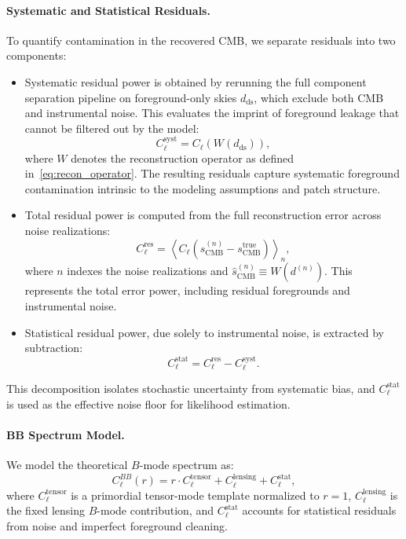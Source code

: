 \documentclass[fleqn,usenatbib]{mnras}
\begin{document}
\paragraph{Systematic and Statistical Residuals.}
To quantify contamination in the recovered CMB, we separate residuals into two components:
\begin{itemize}

    \item Systematic residual power is obtained by rerunning the full component separation pipeline on foreground-only skies \( d_{\mathrm{ds}} \), which exclude both CMB and instrumental noise. This evaluates the imprint of foreground leakage that cannot be filtered out by the model:
    \begin{equation}
    C_\ell^{\mathrm{syst}} = C_\ell \left( W(d_{\mathrm{ds}}) \right),
    \end{equation}
    where \( W \) denotes the reconstruction operator as defined in~\eqref{eq:recon_operator}. The resulting residuals capture systematic foreground contamination intrinsic to the modeling assumptions and patch structure.

    \item Total residual power is computed from the full reconstruction error across noise realizations:
    \begin{equation}
    C_\ell^{\mathrm{res}} = \left\langle C_\ell \left( \hat{s}_{\mathrm{CMB}}^{(n)} - s_{\mathrm{CMB}}^{\mathrm{true}} \right) \right\rangle_{n},
    \end{equation}
    where \( n \) indexes the noise realizations and \( \hat{s}_{\mathrm{CMB}}^{(n)} \equiv W(d^{(n)}) \).
    This represents the total error power, including residual foregrounds and instrumental noise.

    \item Statistical residual power, due solely to instrumental noise, is extracted by subtraction:
    \begin{equation}
    C_\ell^{\mathrm{stat}} = C_\ell^{\mathrm{res}} - C_\ell^{\mathrm{syst}}.
    \end{equation}
\end{itemize}
This decomposition isolates stochastic uncertainty from systematic bias, and \( C_\ell^{\mathrm{stat}} \) is used as the effective noise floor for likelihood estimation.

\paragraph{BB Spectrum Model.}
We model the theoretical \( B \)-mode spectrum as:
\begin{equation}
C_\ell^{BB}(r) = r \cdot C_\ell^{\mathrm{tensor}} + C_\ell^{\mathrm{lensing}} + C_\ell^{\mathrm{stat}},
\end{equation}
where \( C_\ell^{\mathrm{tensor}} \) is a primordial tensor-mode template normalized to \( r = 1 \), \( C_\ell^{\mathrm{lensing}} \) is the fixed lensing \( B \)-mode contribution, and \( C_\ell^{\mathrm{stat}} \) accounts for statistical residuals from noise and imperfect foreground cleaning.
\end{document}

